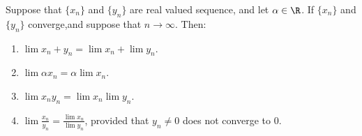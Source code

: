 \begin{theorem}\label{2.2.3}
    Suppose that $\{x_n\}$ and  $\{y_n\}$ are real valued sequence, and let  $\alpha \in \R$. If  $\{x_n\}$ and  $\{y_n\}$ 
    converge,and suppose that $n \rightarrow \infty$. Then:
        \begin{enumerate}[label=(\arabic*)]
            \item $\lim{x_n+y_n}=\lim{x_n}+\lim{y_n}$.

            \item $\lim{\alpha x_n}=\alpha \lim{x_n}$.

            \item $\lim{x_ny_n}=\lim{x_n}\lim{y_n}$.

            \item $\lim{\frac{x_n}{y_n}}=\frac{\lim{x_n}}{\lim{y_n}}$, provided that $y_n \neq 0$ does not converge to $0$.
        \end{enumerate}
\end{theorem}
